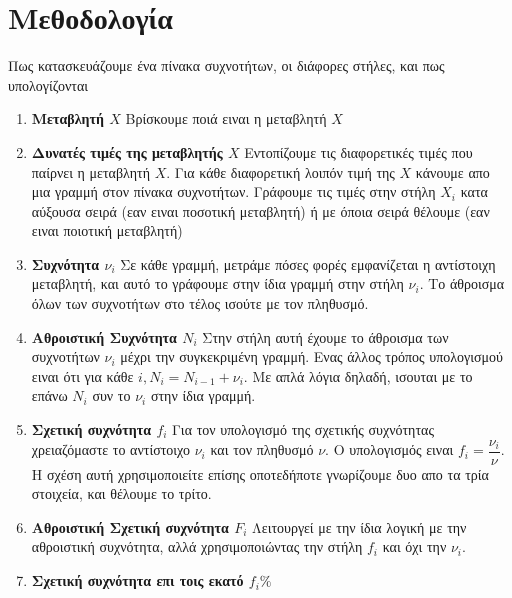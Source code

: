 \documentclass[a4paper,12pt]{article}                      %
\begin{document}
\section{Μεθοδολογία}
Πως κατασκευάζουμε ένα πίνακα συχνοτήτων, οι διάφορες στήλες, και πως υπολογίζονται
\begin{enumerate}
\item \textbf{Μεταβλητή $ X $} Βρίσκουμε ποιά ειναι η μεταβλητή $ X $
\item \textbf{Δυνατές τιμές της μεταβλητής $ X $} Εντοπίζουμε τις διαφορετικές τιμές που παίρνει η μεταβλητή $ X $. Για κάθε διαφορετική λοιπόν τιμή της $ X $ κάνουμε απο μια γραμμή στον πίνακα συχνοτήτων. Γράφουμε τις τιμές στην στήλη $ X_i $ κατα αύξουσα σειρά (εαν ειναι ποσοτική μεταβλητή) ή με όποια σειρά θέλουμε (εαν ειναι ποιοτική μεταβλητή)
\item \textbf{Συχνότητα $ \nu_i$} Σε κάθε γραμμή, μετράμε πόσες φορές εμφανίζεται η αντίστοιχη μεταβλητή, και αυτό το γράφουμε στην ίδια γραμμή στην στήλη $\nu_i$. Το άθροισμα όλων των συχνοτήτων στο τέλος ισούτε με τον πληθυσμό.
\item \textbf{Αθροιστική Συχνότητα $N_i$} Στην στήλη αυτή έχουμε το άθροισμα των συχνοτήτων $ \nu_i $ μέχρι την συγκεκριμένη γραμμή. Ενας άλλος τρόπος υπολογισμού ειναι ότι για κάθε $i, N_i=N_{i-1}+\nu_i$. Με απλά λόγια δηλαδή, ισουται με το επάνω $N_i$ συν το $\nu_i$ στην ίδια γραμμή.
\item \textbf{Σχετική συχνότητα $f_i$ } Για τον υπολογισμό της σχετικής συχνότητας χρειαζόμαστε το αντίστοιχο $\nu_i$ και τον πληθυσμό $\nu$. Ο υπολογισμός ειναι $ f_i=\dfrac{\nu_i}{\nu} $. Η σχέση αυτή χρησιμοποιείτε επίσης οποτεδήποτε γνωρίζουμε δυο απο τα τρία στοιχεία, και θέλουμε το τρίτο.
\item \textbf{Αθροιστική Σχετική συχνότητα $F_i$} Λειτουργεί με την ίδια λογική με την αθροιστική συχνότητα, αλλά χρησιμοποιώντας την στήλη $f_i$ και όχι την $\nu_i$.
\item \textbf{Σχετική συχνότητα επι τοις εκατό $ f_i\% $ }
\end{enumerate}
\end{document}
